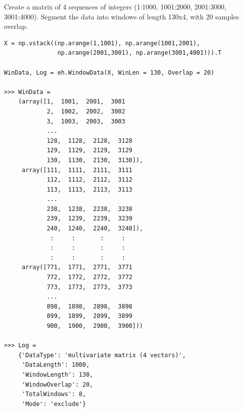 \documentclass[12pt, a4paper, titlepage, openany]{book}
\begin{document}
\newpage
\noindent Create a matrix of 4 sequences of integers (1:1000, 1001:2000, 2001:3000, 3001:4000). Segment the data into windows of length 130x4, with 20 samples overlap.
\begin{verbatim}
X = np.vstack((np.arange(1,1001), np.arange(1001,2001),
               np.arange(2001,3001), np.arange(3001,4001))).T

WinData, Log = eh.WindowData(X, WinLen = 130, Overlap = 20)

>>> WinData =
    (array([1,  1001,  2001,  3001
            2,  1002,  2002,  3002
            3,  1003,  2003,  3003
            ...
            128,  1128,  2128,  3128
            129,  1129,  2129,  3129
            130,  1130,  2130,  3130]),
     array([111,  1111,  2111,  3111
            112,  1112,  2112,  3112
            113,  1113,  2113,  3113
            ...
            238,  1238,  2238,  3238
            239,  1239,  2239,  3239
            240,  1240,  2240,  3240]),
             :     :       :     :
             :     :       :     :
             :     :       :     :
     array([771,  1771,  2771,  3771
            772,  1772,  2772,  3772
            773,  1773,  2773,  3773
            ...
            898,  1898,  2898,  3898
            899,  1899,  2899,  3899
            900,  1900,  2900,  3900]))

>>> Log =
    {'DataType': 'multivariate matrix (4 vectors)',
     'DataLength': 1000,
     'WindowLength': 130,
     'WindowOverlap': 20,
     'TotalWindows': 8,
     'Mode': 'exclude'}
\end{verbatim}






\newpage
\end{document}

